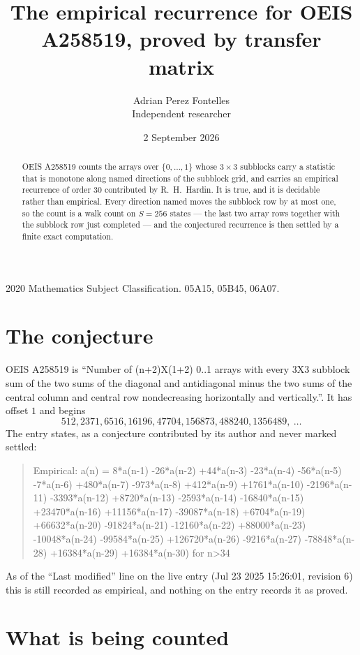 \documentclass[11pt,a4paper]{article}
\title{The empirical recurrence for OEIS A258519, proved by transfer matrix}
\author{Adrian Perez Fontelles\\ \small Independent researcher}
\date{2 September 2026}
\theoremstyle{plain}
\theoremstyle{definition}
\begin{document}
\maketitle

\begin{abstract}
OEIS A258519 counts the arrays over $\{0,\dots,1\}$ whose $3\times3$ subblocks carry a
statistic that is monotone along named directions of the subblock grid, and carries an
empirical recurrence of order $30$ contributed by R.~H.~Hardin. It is true, and it is
decidable rather than empirical. Every direction named moves the subblock row by at most one,
so the count is a walk count on $S=256$ states --- the last two array rows together with the
subblock row just completed --- and the conjectured recurrence is then settled by a finite
exact computation.
\end{abstract}

\noindent\small 2020 Mathematics Subject Classification. 05A15, 05B45, 06A07.\normalsize

\section{The conjecture}

OEIS A258519 is ``Number of (n+2)X(1+2) 0..1 arrays with every 3X3 subblock sum of the two sums of the diagonal and antidiagonal minus the two sums of the central column and central row nondecreasing horizontally and vertically.''. It has offset $1$ and begins
\[
512, 2371, 6516, 16196, 47704, 156873, 488240, 1356489,\ \dots
\]
The entry states, as a conjecture contributed by its author and never marked settled:
\begin{quote}
Empirical: a(n) = 8*a(n-1) -26*a(n-2) +44*a(n-3) -23*a(n-4) -56*a(n-5) -7*a(n-6) +480*a(n-7) -973*a(n-8) +412*a(n-9) +1761*a(n-10) -2196*a(n-11) -3393*a(n-12) +8720*a(n-13) -2593*a(n-14) -16840*a(n-15) +23470*a(n-16) +11156*a(n-17) -39087*a(n-18) +6704*a(n-19) +66632*a(n-20) -91824*a(n-21) -12160*a(n-22) +88000*a(n-23) -10048*a(n-24) -99584*a(n-25) +126720*a(n-26) -9216*a(n-27) -78848*a(n-28) +16384*a(n-29) +16384*a(n-30) for n>34
\end{quote}
As of the ``Last modified'' line on the live entry (Jul 23 2025 15:26:01, revision 6) this is still
recorded as empirical, and nothing on the entry records it as proved.

\section{What is being counted}
\end{document}
